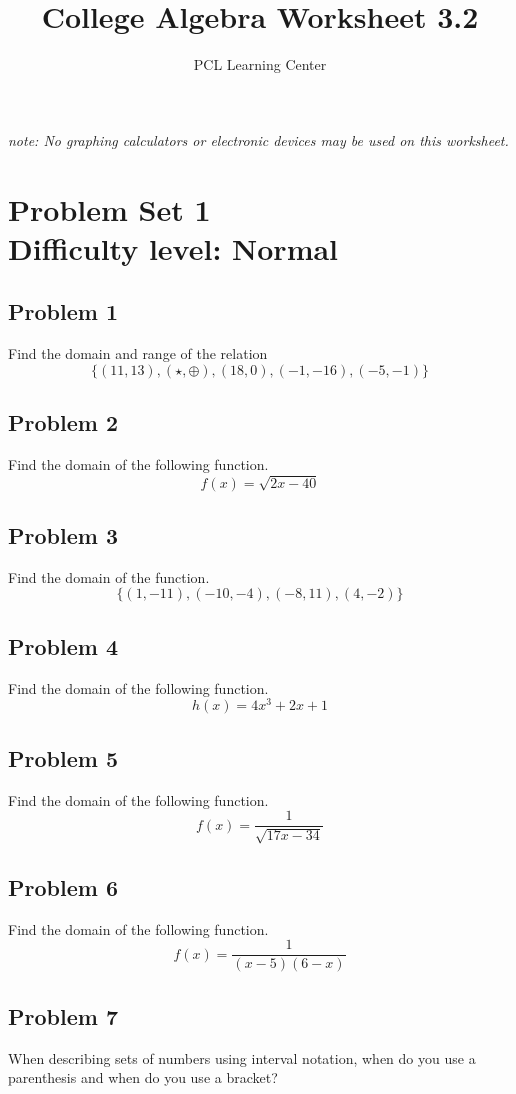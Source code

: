 \documentclass[12pt]{article}
\title{College Algebra Worksheet 3.2}
\author{PCL Learning Center}
\date{}
\begin{document}
\maketitle

\begin{center}
    \textit{note: No graphing calculators or electronic devices may be used on this worksheet.}    
\end{center}

\section*{Problem Set 1\\Difficulty level: Normal}
\subsection*{Problem 1}
Find the domain and range of the relation
\[\{(11,13),(\star, \oplus),(18,0),(-1,-16),(-5,-1)\}\]

\subsection*{Problem 2}
Find the domain of the following function.
\[f(x)=\sqrt{2x-40}\]

\subsection*{Problem 3}
Find the domain of the function.
\[\{(1,-11),(-10,-4),(-8,11),(4,-2)\}\]

\subsection*{Problem 4}
Find the domain of the following function.
\[h(x)=4x^3+2x+1\]

\subsection*{Problem 5}
Find the domain of the following function.
\[f(x)=\dfrac{1}{\sqrt{17x-34}}\]

\subsection*{Problem 6}
Find the domain of the following function.
\[f(x)=\dfrac{1}{(x-5)(6-x)}\]

\subsection*{Problem 7}
When describing sets of numbers using interval notation, when do you use a parenthesis and when do you use a bracket?
\end{document}
